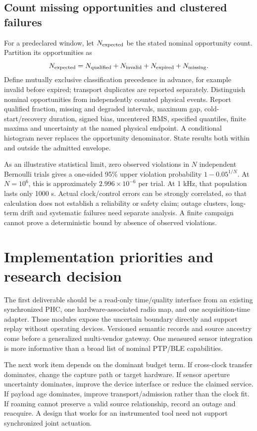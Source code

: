 \documentclass[11pt,letterpaper]{article}
\begin{document}
\subsection{Count missing opportunities and clustered failures}
For a predeclared window, let $N_{\rm expected}$ be the stated nominal opportunity count. Partition its opportunities as
\begin{equation}
 N_{\rm expected}=N_{\rm qualified}+N_{\rm invalid}
 +N_{\rm expired}+N_{\rm missing}.
 \label{eq:counts}
\end{equation}
Define mutually exclusive classification precedence in advance, for example invalid before expired; transport duplicates are reported separately. Distinguish nominal opportunities from independently counted physical events. Report qualified fraction, missing and degraded intervals, maximum gap, cold-start/recovery duration, signed bias, uncentered RMS, specified quantiles, finite maxima and uncertainty at the named physical endpoint. A conditional histogram never replaces the opportunity denominator. State results both within and outside the admitted envelope.

As an illustrative statistical limit, zero observed violations in $N$ independent Bernoulli trials gives a one-sided 95\% upper violation probability $1-0.05^{1/N}$. At $N=10^6$, this is approximately $2.996\times10^{-6}$ per trial. At 1 kHz, that population lasts only 1000 s. Actual clock/control errors can be strongly correlated, so that calculation does not establish a reliability or safety claim; outage clusters, long-term drift and systematic failures need separate analysis. A finite campaign cannot prove a deterministic bound by absence of observed violations.

\section{Implementation priorities and research decision}
The first deliverable should be a read-only time/quality interface from an existing synchronized PHC, one hardware-associated radio map, and one acquisition-time adapter. Those modules expose the uncertain boundary directly and support replay without operating devices. Versioned semantic records and source ancestry come before a generalized multi-vendor gateway. One measured sensor integration is more informative than a broad list of nominal PTP/BLE capabilities.

The next work item depends on the dominant budget term. If cross-clock transfer dominates, change the capture path or target hardware. If sensor aperture uncertainty dominates, improve the device interface or reduce the claimed service. If payload age dominates, improve transport/admission rather than the clock fit. If roaming cannot preserve a valid source relationship, record an outage and reacquire. A design that works for an instrumented tool need not support synchronized joint actuation.
\end{document}
